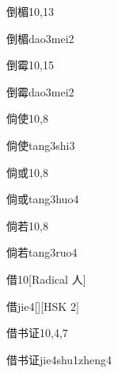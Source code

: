 \begin{entry}{倒楣}{10,13}
  \begin{phonetics}{倒楣}{dao3mei2}
  \end{phonetics}
\end{entry}

\begin{entry}{倒霉}{10,15}
  \begin{phonetics}{倒霉}{dao3mei2}
  \end{phonetics}
\end{entry}

\begin{entry}{倘使}{10,8}
  \begin{phonetics}{倘使}{tang3shi3}
  \end{phonetics}
\end{entry}

\begin{entry}{倘或}{10,8}
  \begin{phonetics}{倘或}{tang3huo4}
  \end{phonetics}
\end{entry}

\begin{entry}{倘若}{10,8}
  \begin{phonetics}{倘若}{tang3ruo4}
  \end{phonetics}
\end{entry}

\begin{entry}{借}{10}[Radical 人]
  \begin{phonetics}{借}{jie4}[][HSK 2]
  \end{phonetics}
\end{entry}

\begin{entry}{借书证}{10,4,7}
  \begin{phonetics}{借书证}{jie4shu1zheng4}
  \end{phonetics}
\end{entry}

